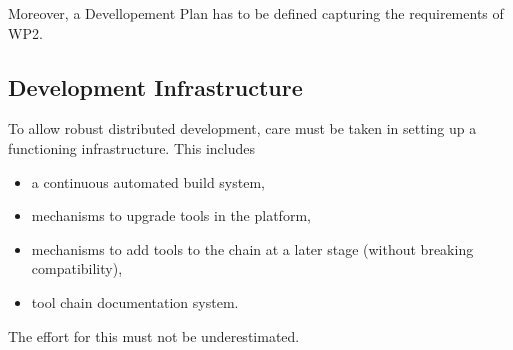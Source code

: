 \documentclass{template/openetcs_article}
\begin{document}
Moreover, a Devellopement Plan has to be defined capturing the requirements of WP2.


\subsection{Development Infrastructure}

To allow robust distributed development, care must be taken in setting up a functioning infrastructure.  This includes 
\begin{itemize}
\item a continuous automated build system, 
\item mechanisms to upgrade tools in the platform, 
\item mechanisms to add tools to the chain at a later stage (without breaking compatibility),
\item tool chain documentation system. 
\end{itemize}
 The effort for this must not be underestimated.
\end{document}
